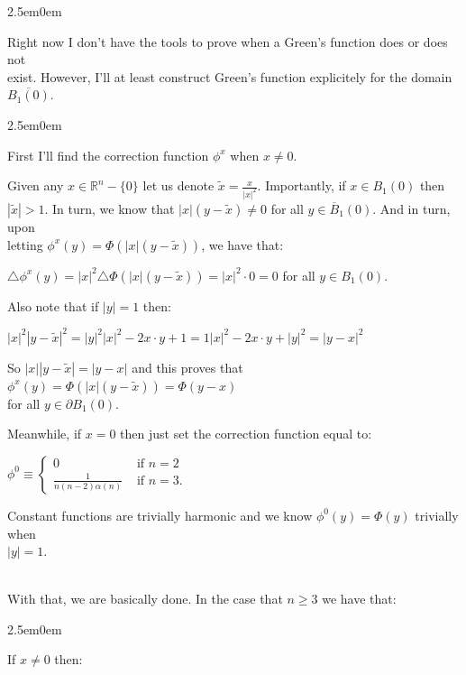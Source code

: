 \documentclass{book}
\newcommand{\hTwo}{%
\color{Black}%
   \fontsize{13}{15}\selectfont%
}
\newcommand{\pracTwo}{
   \color{Orange}%
   \fontsize{12}{14}\selectfont%
}
\newcommand{\exPPP}{%
   \color{VioletRed}%
   \fontsize{12}{14}\selectfont%
}
\newenvironment{myIndent}{%
   \begin{adjustwidth}{2.5em}{0em}%
}{%
   \end{adjustwidth}%
}
\newcommand{\mySepFour}[1][.]{%
   {\noindent\color{#1}{\rule{5.5in}{0.12mm}}}\\%
}
\newcommand{\retTwo}{\hfill\bigbreak}
\begin{document}
\hTwo\begin{myIndent}\mySepFour\end{myIndent}

Right now I don't have the tools to prove when a {\color{OliveGreen}Green's function} does or does not\\ exist. However, I'll at least construct {\color{OliveGreen}Green's function} explicitely for the domain $\overline{B_1(0)}$.\\ [-8pt]
\begin{myIndent}\pracTwo
	First I'll find the correction function $\phi^x$ when $x \neq 0$.\retTwo

	Given any $x \in \mathbb{R}^n - \{0\}$ let us denote $\widetilde{x} = \frac{x}{|x|^2}$. Importantly, if $x \in B_1(0)$ then\\ $|\widetilde{x}| > 1$. In turn, we know that $|x|(y - \widetilde{x}) \neq 0$ for all $y \in \overline{B}_1(0)$. And in turn, upon\\ [2pt] letting $\phi^x(y) = \Phi(|x|(y - \widetilde{x}))$, we have that:

	{\center$\triangle \phi^x(y) = |x|^2\triangle \Phi(|x|(y - \widetilde{x})) = |x|^2 \cdot 0 = 0$ for all $y \in B_1(0)$.\retTwo\par}

	Also note that if $|y| = 1$ then:

	{\centering $|x|^2|y - \widetilde{x}|^2 = |y|^2|x|^2 - 2x \cdot y + 1 = 1|x|^2 - 2x \cdot y + |y|^2 = |y - x|^2$ \retTwo\par}

	So $|x||y - \widetilde{x}| = |y - x|$ and this proves that $\phi^x(y) = \Phi(|x|(y - \widetilde{x})) = \Phi(y - x)$\\ for all $y \in \partial B_1(0)$.\retTwo

	Meanwhile, if $x = 0$ then just set the correction function equal to:

	{\centering $\phi^0 \equiv \begin{cases} 0 & \text{ if } n = 2\\ \frac{1}{n(n-2)\alpha(n)} & \text{ if } n = 3\text{.}\end{cases}$\newpage\par}

	Constant functions are trivially harmonic and we know $\phi^0(y) = \Phi(y)$ trivially when\\ $|y| = 1$.

	\mySepFour 

	With that, we are basically done. In the case that $n \geq 3$ we have that:
	\begin{myIndent}\exPPP
		If $x \neq 0$ then:
		

\end{myIndent}
\end{myIndent}
\end{document}
